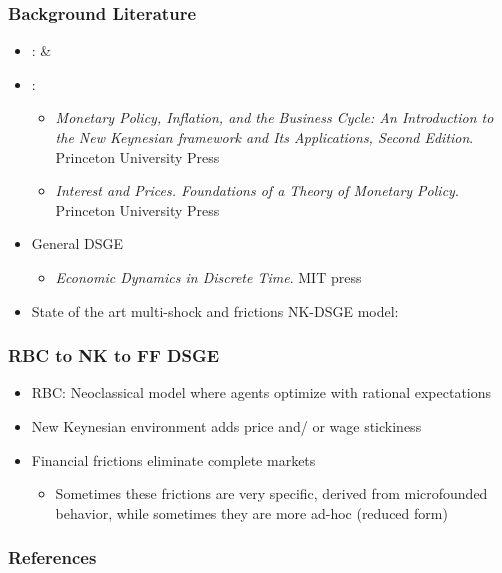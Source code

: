 \documentclass[xcolor=dvipsnames,handout]{beamer}
\begin{document}
\begin{frame}[c]\frametitle {\textbf{Background Literature}} \label{conclusion}
\begin{itemize}
    \setlength\itemsep{1.5em}
\item {\color{black}{Seminal RBC models}}:  \textcite{kydland1982time} \& \textcite{long1983real}
\item {\color{black}{New Keynesian bible(s)}}:
\begin{itemize}
     \item   \textcite{gali2015monetary} \textit{Monetary Policy, Inflation, and the Business Cycle: An Introduction to the New Keynesian
framework and Its Applications, Second Edition}. Princeton University Press
\item \textcite{woodford2011interest}
\textit{Interest and Prices. Foundations of a Theory of Monetary Policy}. Princeton University Press
\end{itemize} 
\item General DSGE 
\begin{itemize}
    \item \textcite{miao2020economic} \textit{Economic Dynamics in Discrete Time}. MIT press
\end{itemize}
\item State of the art multi-shock and frictions NK-DSGE model: \textcite{smets2007shocks}
\end{itemize}
\end{frame}

\begin{frame}[c]\frametitle {\textbf{RBC to NK to FF DSGE}} \label{conclusion}
\begin{itemize}
   \item RBC: Neoclassical model where agents optimize with rational expectations
   \item New Keynesian environment adds price and/ or wage stickiness
   \item Financial frictions eliminate complete markets
   \begin{itemize}
       \item Sometimes these frictions are very specific, derived from microfounded behavior, while sometimes they are more ad-hoc (reduced form)
   \end{itemize}
\end{itemize}
\end{frame}


\begin{frame}[allowframebreaks]\frametitle {\textbf{References}}
%
\printbibliography
\end{frame}
\end{document}
